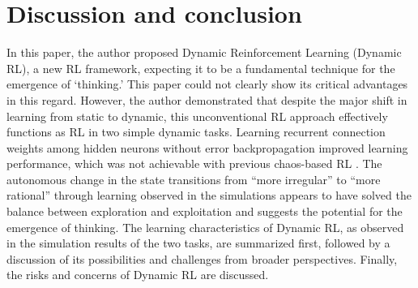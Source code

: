 \section{Discussion and conclusion}\label{Sec:Discussion}
In this paper, the author proposed Dynamic Reinforcement Learning (Dynamic RL), a new RL framework,
expecting it to be a fundamental technique for the emergence of `thinking.'
This paper could not clearly show its critical advantages in this regard. 
However, the author demonstrated that despite the major shift in learning from static to dynamic,
this unconventional RL approach effectively functions as RL in two simple dynamic tasks.
Learning recurrent connection weights among hidden neurons without error backpropagation
improved learning performance, which was not achievable with previous chaos-based RL \citep{IJCNN2015}.
The autonomous change in the state transitions from ``more irregular'' to ``more rational'' through learning observed in the simulations
appears to have solved the balance between exploration and exploitation \citep{Sutton1998}
and suggests the potential for the emergence of thinking.
The learning characteristics of Dynamic RL, as observed in the simulation results of the two tasks,
are summarized first, followed by a discussion of its possibilities and challenges from broader perspectives.
Finally, the risks and concerns of Dynamic RL are discussed.

